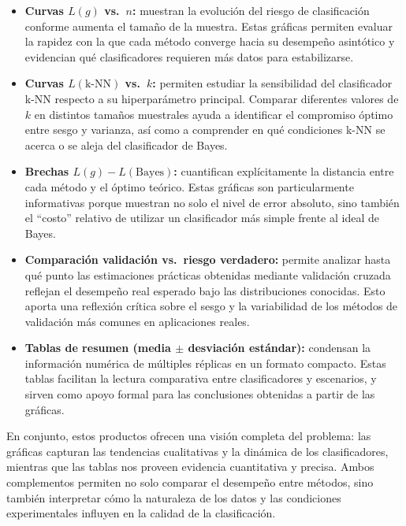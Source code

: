 \documentclass[10pt]{article}
\begin{document}
\begin{itemize}
    \item \textbf{Curvas $L(g)$ vs.\ $n$:} muestran la evolución del riesgo de clasificación conforme aumenta el tamaño de la muestra. Estas gráficas permiten evaluar la rapidez con la que cada método converge hacia su desempeño asintótico y evidencian qué clasificadores requieren más datos para estabilizarse.

    \item \textbf{Curvas $L(\text{k-NN})$ vs.\ $k$:} permiten estudiar la sensibilidad del clasificador k-NN respecto a su hiperparámetro principal. Comparar diferentes valores de $k$ en distintos tamaños muestrales ayuda a identificar el compromiso óptimo entre sesgo y varianza, así como a comprender en qué condiciones k-NN se acerca o se aleja del clasificador de Bayes.

    \item \textbf{Brechas $L(g) - L(\text{Bayes})$:} cuantifican explícitamente la distancia entre cada método y el óptimo teórico. Estas gráficas son particularmente informativas porque muestran no solo el nivel de error absoluto, sino también el “costo” relativo de utilizar un clasificador más simple frente al ideal de Bayes.

    \item \textbf{Comparación validación vs.\ riesgo verdadero:} permite analizar hasta qué punto las estimaciones prácticas obtenidas mediante validación cruzada reflejan el desempeño real esperado bajo las distribuciones conocidas. Esto aporta una reflexión crítica sobre el sesgo y la variabilidad de los métodos de validación más comunes en aplicaciones reales.

    \item \textbf{Tablas de resumen (media $\pm$ desviación estándar):} condensan la información numérica de múltiples réplicas en un formato compacto. Estas tablas facilitan la lectura comparativa entre clasificadores y escenarios, y sirven como apoyo formal para las conclusiones obtenidas a partir de las gráficas.
\end{itemize}

En conjunto, estos productos ofrecen una visión completa del problema: las gráficas capturan las tendencias cualitativas y la dinámica de los clasificadores, mientras que las tablas nos proveen evidencia cuantitativa y precisa. Ambos complementos permiten no solo comparar el desempeño entre métodos, sino también interpretar cómo la naturaleza de los datos y las condiciones experimentales influyen en la calidad de la clasificación.
\end{document}
